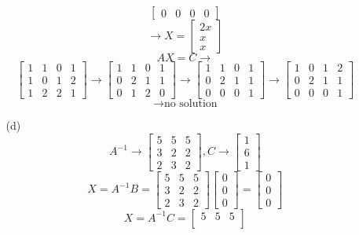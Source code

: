 \documentclass[12pt]{article}
\begin{document}
\begin{itemize}
\begin{itemize}
$$\begin{bmatrix}
0 & 0 & 0 & 0
\end{bmatrix}$$
$$\rightarrow X = \begin{bmatrix}
2x \\
x \\
x
\end{bmatrix}$$
$$AX = C \rightarrow $$
$$\begin{bmatrix}
1 & 1 & 0 & 1 \\
1 & 0 & 1 & 2 \\
1 & 2 & 2 & 1
\end{bmatrix} \rightarrow \begin{bmatrix}
1 & 1 & 0 & 1 \\
0 & 2 & 1 & 1 \\
0 & 1 & 2 & 0
\end{bmatrix} \rightarrow \begin{bmatrix}
1 & 1 & 0 & 1 \\
0 & 2 & 1 & 1 \\
0 & 0 & 0 & 1
\end{bmatrix} \rightarrow \begin{bmatrix}
1 & 0 & 1 & 2 \\
0 & 2 & 1 & 1 \\
0 & 0 & 0 & 1
\end{bmatrix}$$
$$\rightarrow \text{no solution}$$
\item[(d)]
$$A^{-1} \rightarrow \begin{bmatrix}
5 & 5 & 5 \\
3 & 2 & 2 \\
2 & 3 & 2
\end{bmatrix}, C \rightarrow \begin{bmatrix}
1 \\
6 \\
1
\end{bmatrix}$$
$$X = A^{-1}B = \begin{bmatrix}
5 & 5 & 5 \\
3 & 2 & 2 \\
2 & 3 & 2
\end{bmatrix}\begin{bmatrix}
0 \\
0 \\
0
\end{bmatrix} = \begin{bmatrix}
0 \\
0 \\
0
\end{bmatrix}$$
$$X = A^{-1}C = \begin{bmatrix}
5 & 5 & 5 \\

\end{bmatrix}$$
\end{itemize}
\end{itemize}
\end{document}
